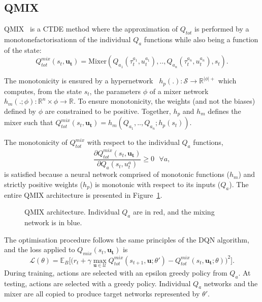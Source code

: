 \subsection{QMIX}
QMIX~\citep{Rashid2018} is a CTDE method where the approximation of $Q_{tot}$ is performed by a monotonefactorisationn of the individual $Q_a$ functions while also being a function of the state:
\begin{equation}
     Q_{tot}^{mix}(s_t, \mathbf{u_t})=\text{Mixer} \left(Q_{a_1}(\tau^{a_1}_t, u_t^{a_1}) ,..,Q_{a_n}(\tau^{a_n}_t, u_t^{a_n}), s_t\right).
     \label{eq:ch3_qmixappendix}
\end{equation}

The monotonicity is ensured by a hypernetwork~\citep{Ha2016HyperNetworks} $h_p(.): \mathcal{S} \rightarrow \mathbb{R}^{|\phi|+}$ which computes, from the state $s_t$, the parameters $\phi$ of a mixer network $h_m(.;\phi):\mathbb{R}^n \times \phi \rightarrow \mathbb{R}$.
To ensure monotonicity, the weights (and not the biases) defined by $\phi$ are constrained to be positive.
Together, $h_p$ and $h_m$ defines the mixer such that $ Q_{tot}^{mix}(s_t, \mathbf{u_t}) = h_m\left(Q_{a_1},..,Q_{a_n}; h_p(s_t)\right)$.

The monotonicity of $Q_{tot}^{mix}$ with respect to the individual $Q_a$ functions, 
\begin{equation}
    \frac{\partial Q_{tot}^{mix}(s_t, \mathbf{u_t})}{\partial Q_{a}(s_t, u_t^{a})} \geq 0 \text{ } \forall a
    \label{eq:ch3_monotonicity},
\end{equation}
is satisfied because a neural network comprised of monotonic functions ($h_m$) and strictly positive weights ($h_p$) is monotonic with respect to its inputs ($Q_a$). 
The entire QMIX architecture is presented in Figure~\ref{fig:qmix}.

\begin{figure}
\centering

\caption{QMIX architecture. Individual $Q_a$ are in red, and the mixing network is in blue.}
\label{fig:qmix}
\end{figure}

The optimisation procedure follows the same principles of the DQN algorithm, and the loss applied to $Q_{mix}(s_t, \mathbf{u_t})$ is 
\begin{equation}
    \mathcal{L}(\theta) = \mathbb{E}_{B}
    \bigg[  
    \big(r_{t} + \gamma \max_{\mathbf{u} \in \mathcal{U}} Q_{tot}^{mix}(s_{t+1}, \mathbf{u}; \theta')
    - Q_{tot}^{mix}(s_{t}, \mathbf{u_{t}}; \theta)\big)^{2}
    \bigg].
    \label{eq:QMIX_loss}
\end{equation}
During training, actions are selected with an epsilon greedy policy from $Q_a$.
At testing, actions are selected with a greedy policy.
Individual $Q_a$ networks and the mixer are all copied to produce target networks represented by $\theta'$.

